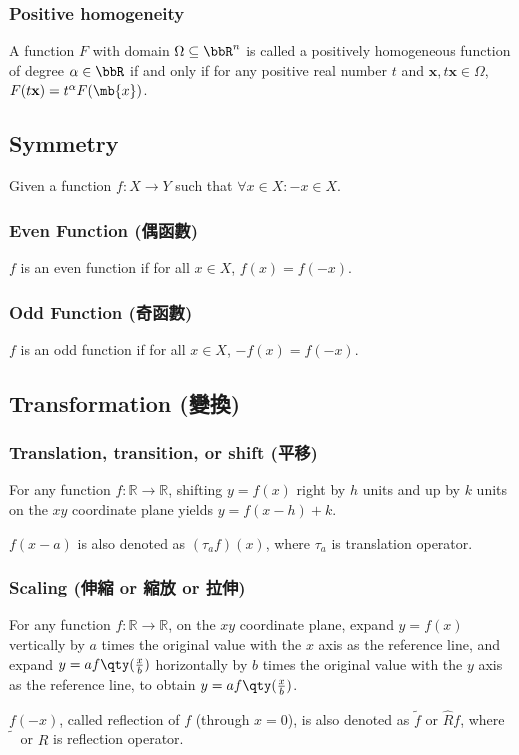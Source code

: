 \subsubsection{Positive homogeneity}
A function $F$ with domain $\Omega\subseteq\bbR^n$ is called a positively homogeneous function of degree $\alpha\in\bbR$ if and only if for any positive real number $t$ and $\mathbf{x},t\mathbf{x}\in\Omega$, $F(t\mathbf{x})=t^{\alpha}F(\mb{x})$.
\subsection{Symmetry}
Given a function $f\colon X\to Y$ such that $\forall x\in X\colon -x\in X$.
\subsubsection{Even Function (偶函數)}
$f$ is an even function if for all $x\in X$, $f(x)=f(-x)$.
\subsubsection{Odd Function (奇函數)}
$f$ is an odd function if for all $x\in X$, $-f(x)=f(-x)$.
\subsection{Transformation (變換)}
\subsubsection{Translation, transition, or shift (平移)}
For any function $f\colon\mathbb{R}\to\mathbb{R}$, shifting $y=f(x)$ right by $h$ units and up by $k$ units on the $xy$ coordinate plane yields $y=f(x-h)+k$.

$f(x-a)$ is also denoted as $(\tau_af)(x)$, where $\tau_a$ is translation operator.
\subsubsection{Scaling (伸縮 or 縮放 or 拉伸)}
For any function $f\colon\mathbb{R}\to\mathbb{R}$, on the $xy$ coordinate plane, expand $y=f(x)$ vertically by $a$ times the original value with the $x$ axis as the reference line, and expand $y=af\qty(\frac{x}{b})$ horizontally by $b$ times the original value with the $y$ axis as the reference line, to obtain $y=af\qty(\frac{x}{b})$.

$f(-x)$, called reflection of $f$ (through $x=0$), is also denoted as $\tilde{f}$ or $\hat{R}f$, where $\tilde{\phantom{f}}$ or $\hat{R}$ is reflection operator.

